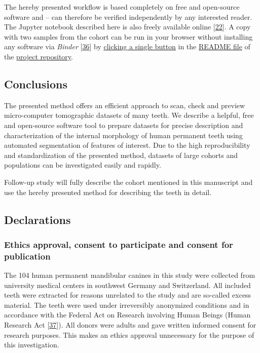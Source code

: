 \documentclass[
  american,
]{article}
\begin{document}
The hereby presented workflow is based completely on free and open-source software and -- can therefore be verified independently by any interested reader.
The Jupyter notebook described here is also freely available online {[}\protect\hyperlink{ref-tZRGGuMm}{22}{]}.
A copy with two samples from the cohort can be run in your browser without installing any software via \emph{Binder} {[}\protect\hyperlink{ref-Q20Bxdsr}{36}{]} by \href{https://mybinder.org/v2/gh/habi/zmk-tooth-cohort/master?filepath=ToothAnalysis.ipynb}{clicking a single button} in the \href{https://github.com/habi/zmk-tooth-cohort/blob/master/README.md}{README file} of the \href{https://github.com/habi/zmk-tooth-cohort/}{project repository}.

\hypertarget{conclusions}{%
\subsection{Conclusions}\label{conclusions}}

The presented method offers an efficient approach to scan, check and preview micro-computer tomographic datasets of many teeth.
We describe a helpful, free and open-source software tool to prepare datasets for precise description and characterization of the internal morphology of human permanent teeth using automated segmentation of features of interest.
Due to the high reproducibility and standardization of the presented method, datasets of large cohorts and populations can be investigated easily and rapidly.

Follow-up study will fully describe the cohort mentioned in this manuscript and use the hereby presented method for describing the teeth in detail.

\hypertarget{declarations}{%
\subsection{Declarations}\label{declarations}}

\hypertarget{ethics-approval-consent-to-participate-and-consent-for-publication}{%
\subsubsection{Ethics approval, consent to participate and consent for publication}\label{ethics-approval-consent-to-participate-and-consent-for-publication}}

The 104 human permanent mandibular canines in this study were collected from university medical centers in southwest Germany and Switzerland.
All included teeth were extracted for reasons unrelated to the study and are so-called excess material.
The teeth were used under irreversibly anonymized conditions and in accordance with the Federal Act on Research involving Human Beings (Human Research Act {[}\protect\hyperlink{ref-10OKzEtEb}{37}{]}).
All donors were adults and gave written informed consent for research purposes.
This makes an ethics approval unnecessary for the purpose of this investigation.
\end{document}
